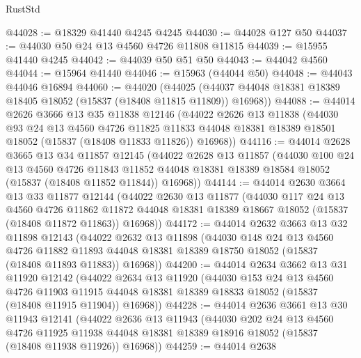 \begin{lexlean}{RustStd}
\begin{coremodule}
{\begin{coremodule}
{{{{{{{{{{{{{{{{{{{{{{{{{{{{{{{{{{{{{{{{{{{{{{{{{{{{{{{{{{{{@44028 := @18329 @41440 @4245 @4245
@44030 := @44028 @127 @50
@44037 := @44030 @50 @24 @13 @4560 @4726 @11808 @11815
@44039 := @15955 @41440 @4245
@44042 := @44039 @50 @51 @50
@44043 := @44042 @4560
@44044 := @15964 @41440
@44046 := @15963 (@44044 @50)
@44048 := @44043 @44046 @16894
@44060 := @44020
    (@44025 (@44037 @44048 @18381 @18389 @18405 @18052 (@15837 (@18408 @11815 @11809)) @16968))
@44088 := @44014
    @2626
    @3666
    @13
    @35
    @11838
    @12146
    (@44022
      @2626
      @13
      @11838
      (@44030
        @93
        @24
        @13
        @4560
        @4726
        @11825
        @11833
        @44048
        @18381
        @18389
        @18501
        @18052
        (@15837 (@18408 @11833 @11826))
        @16968))
@44116 := @44014
    @2628
    @3665
    @13
    @34
    @11857
    @12145
    (@44022
      @2628
      @13
      @11857
      (@44030
        @100
        @24
        @13
        @4560
        @4726
        @11843
        @11852
        @44048
        @18381
        @18389
        @18584
        @18052
        (@15837 (@18408 @11852 @11844))
        @16968))
@44144 := @44014
    @2630
    @3664
    @13
    @33
    @11877
    @12144
    (@44022
      @2630
      @13
      @11877
      (@44030
        @117
        @24
        @13
        @4560
        @4726
        @11862
        @11872
        @44048
        @18381
        @18389
        @18667
        @18052
        (@15837 (@18408 @11872 @11863))
        @16968))
@44172 := @44014
    @2632
    @3663
    @13
    @32
    @11898
    @12143
    (@44022
      @2632
      @13
      @11898
      (@44030
        @148
        @24
        @13
        @4560
        @4726
        @11882
        @11893
        @44048
        @18381
        @18389
        @18750
        @18052
        (@15837 (@18408 @11893 @11883))
        @16968))
@44200 := @44014
    @2634
    @3662
    @13
    @31
    @11920
    @12142
    (@44022
      @2634
      @13
      @11920
      (@44030
        @153
        @24
        @13
        @4560
        @4726
        @11903
        @11915
        @44048
        @18381
        @18389
        @18833
        @18052
        (@15837 (@18408 @11915 @11904))
        @16968))
@44228 := @44014
    @2636
    @3661
    @13
    @30
    @11943
    @12141
    (@44022
      @2636
      @13
      @11943
      (@44030
        @202
        @24
        @13
        @4560
        @4726
        @11925
        @11938
        @44048
        @18381
        @18389
        @18916
        @18052
        (@15837 (@18408 @11938 @11926))
        @16968))
@44259 := @44014
    @2638
}}}}}}}}}}}}}}}}}}}}}}}}}}}}}}}}}}}}}}}}}}}}}}}}}}}}}}}}}}}}
\end{coremodule}}
\end{coremodule}
\end{lexlean}
